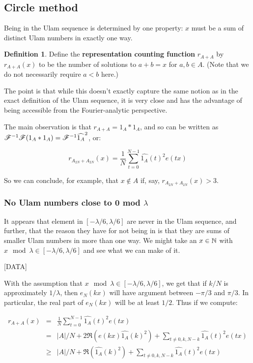 \documentclass{article}
\theoremstyle{definition}
\newtheorem{definition}{Definition}
\theoremstyle{remark}
\numberwithin{equation}{section}
\begin{document}
\subsection{Circle method}

Being in the Ulam sequence is determined by one property: $x$ must be
a sum of distinct Ulam numbers in exactly one way.  

\begin{definition}Define the \textbf{representation counting function}
  $r_{A+A}$ by $r_{A+A}(x)$ to be the number of solutions to $a+b = x$
  for $a, b \in A$.  (Note that we do not necessarily require $a < b$
  here.)
\end{definition} 

The point is that while this doesn't exactly capture the same notion
as in the exact definition of the Ulam sequence, it is very close and
has the advantage of being accessible from the Fourier-analytic
perspective.  

The main observation is that $r_{A+A} = 1_A \ast 1_A$, and so can be
written as $\mathscr{F}^{-1}\mathscr{F} (1_A \ast 1_A) =
\mathscr{F}^{-1} \widehat{1_A}^2$, or: 

\[r_{A_{2N}+A_{2N}}(x) = \frac 1N \sum_{t=0}^{N-1} \widehat{1_A}(t)^2
e(tx)\]

So we can conclude, for example, that $x \notin A$ if, say,
$r_{A_{2N}+A_{2N}}(x) > 3$.  

\subsubsection{No Ulam numbers close to 0 mod $\lambda$}

It appears that element in $[-\lambda/6,\lambda/6]$ are never in the
Ulam sequence, and further, that the reason they have for not being in
is that they are sums of smaller Ulam numbers in more than one way.
We might take an $x \in \mathbb{N}$ with
$x \mod{\lambda} \in [-\lambda/6,\lambda/6]$ and see what we can make
of it.  

[DATA]

With the assumption that $x \mod{\lambda} \in [-\lambda/6,\lambda/6]$,
we get that if $k/N$ is approximately $1/\lambda$, then $e_N(kx)$ will
have argument between $-\pi/3$ and $\pi/3$.  In particular, the real
part of $e_N(kx)$ will be at least $1/2$.  Thus if we compute: 

\begin{eqnarray*}
r_{A+A}(x) &=& \frac 1N \sum_{t=0}^{N-1} \widehat{1_A}(t)^2 e(tx)\\
 &=& |A|/N + 2\Re(e(kx)\widehat{1_A}(k)^2) + \sum_{t\neq 0,k,N-k}
 \widehat{1_A}(t)^2 e(tx)\\
 &\geq& |A|/N + \Re(\widehat{1_A}(k)^2) + \sum_{t\neq 0,k,N-k}
 \widehat{1_A}(t)^2 e(tx)\\
\end{eqnarray*}
\end{document}

